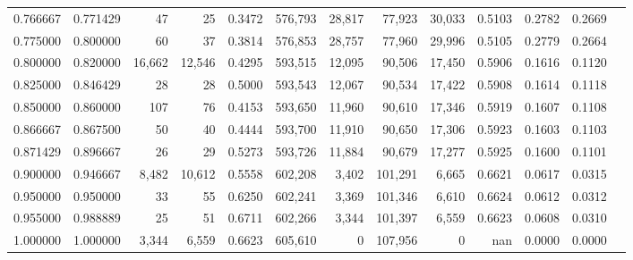 \begin{tabular}{rrrrrrrrrrrrr}
0.766667 & 0.771429 &     47 &     25 &                                     0.3472 & 576,793 &  28,817 &  77,923 &  30,033 & 0.5103 & 0.2782 & 0.2669 \\
0.775000 & 0.800000 &     60 &     37 &                                     0.3814 & 576,853 &  28,757 &  77,960 &  29,996 & 0.5105 & 0.2779 & 0.2664 \\
0.800000 & 0.820000 & 16,662 & 12,546 &                                     0.4295 & 593,515 &  12,095 &  90,506 &  17,450 & 0.5906 & 0.1616 & 0.1120 \\
0.825000 & 0.846429 &     28 &     28 &                                     0.5000 & 593,543 &  12,067 &  90,534 &  17,422 & 0.5908 & 0.1614 & 0.1118 \\
0.850000 & 0.860000 &    107 &     76 &                                     0.4153 & 593,650 &  11,960 &  90,610 &  17,346 & 0.5919 & 0.1607 & 0.1108 \\
0.866667 & 0.867500 &     50 &     40 &                                     0.4444 & 593,700 &  11,910 &  90,650 &  17,306 & 0.5923 & 0.1603 & 0.1103 \\
0.871429 & 0.896667 &     26 &     29 &                                     0.5273 & 593,726 &  11,884 &  90,679 &  17,277 & 0.5925 & 0.1600 & 0.1101 \\
0.900000 & 0.946667 &  8,482 & 10,612 &                                     0.5558 & 602,208 &   3,402 & 101,291 &   6,665 & 0.6621 & 0.0617 & 0.0315 \\
0.950000 & 0.950000 &     33 &     55 &                                     0.6250 & 602,241 &   3,369 & 101,346 &   6,610 & 0.6624 & 0.0612 & 0.0312 \\
0.955000 & 0.988889 &     25 &     51 &                                     0.6711 & 602,266 &   3,344 & 101,397 &   6,559 & 0.6623 & 0.0608 & 0.0310 \\
1.000000 & 1.000000 &  3,344 &  6,559 &                                     0.6623 & 605,610 &       0 & 107,956 &       0 &    nan & 0.0000 & 0.0000 \\
\bottomrule
\end{tabular}

